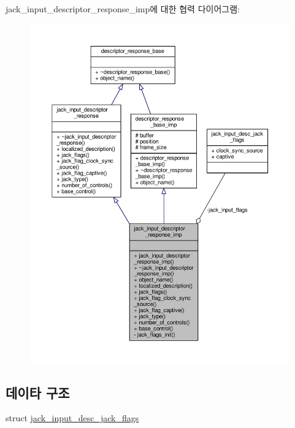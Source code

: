 jack\+\_\+input\+\_\+descriptor\+\_\+response\+\_\+imp에 대한 협력 다이어그램\+:
\nopagebreak
\begin{figure}[H]
\begin{center}
\leavevmode
\includegraphics[width=350pt]{classavdecc__lib_1_1jack__input__descriptor__response__imp__coll__graph}
\end{center}
\end{figure}
\subsection*{데이타 구조}
\begin{DoxyCompactItemize}
\item 
struct \hyperlink{structavdecc__lib_1_1jack__input__descriptor__response__imp_1_1jack__input__desc__jack__flags}{jack\+\_\+input\+\_\+desc\+\_\+jack\+\_\+flags}
\end{DoxyCompactItemize}
